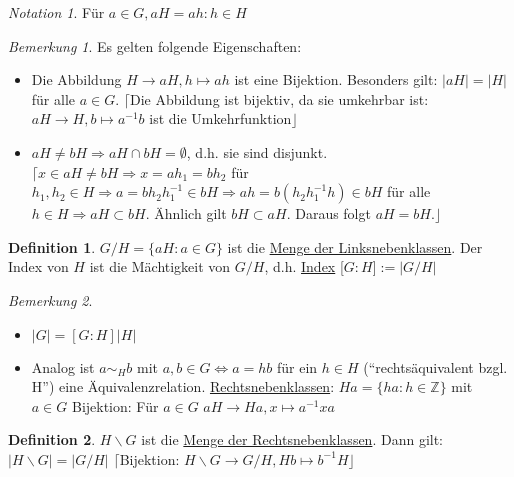 \documentclass[fleqn, 12pt]{scrartcl}
\theoremstyle{definition}
\newtheorem*{defn}{Definition}
\theoremstyle{remark}
\newtheorem*{notation}{Notation}
\newtheorem*{nb}{Bemerkung}
\begin{document}
\begin{notation}
	Für \(a \in G, aH = {ah : h \in H}\)
\end{notation}

\begin{nb}
	Es gelten folgende Eigenschaften: 
	\begin{itemize}
		\item Die Abbildung \(H \rightarrow aH, h \mapsto ah\) ist eine Bijektion. Besonders gilt: \(\vert aH \vert = \vert H \vert\) für alle \(a \in G\). \newline \(\lceil\)Die Abbildung ist bijektiv, da sie umkehrbar ist: \(aH \rightarrow H, b \mapsto a^{-1}b\) ist die Umkehrfunktion\(\rfloor\)
		\item \(aH \neq bH \Rightarrow aH \cap bH = \emptyset\), d.h. sie sind disjunkt. \newline \(\lceil x \in aH \neq bH \Rightarrow x = ah_{1} = bh_{2}\) für \(h_{1},h_{2} \in H \Rightarrow a=bh_{2}h_{1}^{-1} \in bH \Rightarrow ah= b(h_{2}h_{1}^{-1}h) \in bH\) für alle \(h \in H \Rightarrow aH \subset bH\). Ähnlich gilt \(bH \subset aH\). Daraus folgt \(aH=bH.\rfloor\)
	\end{itemize}
\end{nb}

\begin{defn}
	\(G/H = \lbrace aH : a \in G \rbrace\) ist die \underline{Menge der Linksnebenklassen}. \newline Der Index von \(H\) ist die Mächtigkeit von \(G/H\), d.h. \underline{Index} [\(G:H\)]\(:=\vert G/H \vert\)
\end{defn}

\begin{nb}
	\begin{itemize}
	 	\item \(\vert G \vert = [G:H]\vert H\vert\)
	 	\item Analog ist \(a \sim_{H} b\) mit \(a,b \in G \Leftrightarrow a=hb\) für ein \(h \in H\) (“rechtsäquivalent bzgl. H”) eine Äquivalenzrelation. \newline \underline{Rechtsnebenklassen}: \(Ha=\lbrace ha : h \in \mathbb{Z} \rbrace\) mit \(a \in G\) \newline Bijektion: Für \(a \in G\) \(aH \rightarrow Ha, x \mapsto a^{-1}xa\)
	\end{itemize}
\end{nb}

\begin{defn}
	\(H \backslash G\) ist die \underline{Menge der Rechtsnebenklassen}. Dann gilt: \(\vert H \backslash G \vert = \vert G/H \vert\) \newline \(\lceil\)Bijektion: \(H \backslash G \rightarrow G/H, Hb \mapsto b^{-1}H \rfloor\)
\end{defn}
\end{document}
